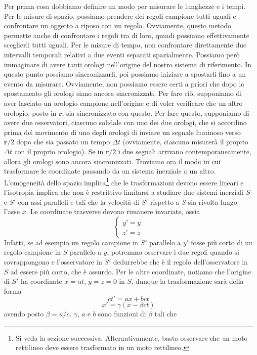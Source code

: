 \documentclass[a4paper,11pt]{book}
\renewcommand{\vec}[1]{\mathbf{#1}}
\theoremstyle{theorem}
\theoremstyle{definition}
\begin{document}
\noindent Per prima cosa dobbiamo definire un modo per misurare le lunghezze e i tempi. Per le misure di spazio, possiamo prendere dei regoli campione tutti uguali e confrontare un oggetto a riposo con un regolo. Ovviamente, questo metodo permette anche di confrontare i regoli tra di loro, quindi possiamo effettivamente sceglierli tutti uguali. Per le misure di tempo, non confrontare direttamente due intervalli temporali relativi a due eventi separati spazialmente. Possiamo però immaginare di avere tanti orologi nell'origine del nostro sistema di riferimento. In questo punto possiamo sincronizzarli, poi possiamo iniziare a spostarli fino a un evento da misurare. Ovviamente, non possiamo essere certi a priori che dopo lo spostamento gli orologi siano ancora sincronizzati. Per fare ciò, supponiamo di aver lasciato un orologio campione nell'origine e di voler verificare che un altro orologio, posto in $\vec{r}$, sia sincronizzato con questo. Per fare questo, supponiamo di avere due osservatori, ciascuno solidale con uno dei due orologi, che si accordino prima del movimento di uno degli orologi di inviare un segnale luminoso verso $\vec{r}/2$ dopo che sia passato un tempo $\Delta t$ (ovviamente, ciascuno misurerà il proprio $\Delta t$ con il proprio orologio). Se in $\vec{r}/2$ i due segnali arrivano contemporaneamente, allora gli orologi sono ancora sincronizzati.
Troviamo ora il modo in cui trasformare le coordinate passando da un sistema inerziale a un altro. L'omogeneità dello spazio implica\footnote{Si veda la sezione successiva. Alternativamente, basta osservare che un moto rettilineo deve essere trasformato in un moto rettilineo.} che le trasformazioni devono essere lineari e l'isotropia implica che non è restrittivo limitarsi a studiare due sistemi inerziali $S$ e $S'$ con assi paralleli e tali che la velocità di $S'$ rispetto a $S$ sia rivolta lungo l'asse $x$. Le coordinate trasverse devono rimanere invariate, ossia
\[\begin{cases}
y'=y\\z'=z
\end{cases}\]
Infatti, se ad esempio un regolo campione in $S'$ parallelo a $y'$ fosse più corto di un regolo campione in $S$ parallelo a $y$, potremmo osservare i due regoli quando si sovrappongono e l'osservatore in $S'$ dedurrebbe che è il regolo dell'osservatore in $S$ ad essere più corto, che è assurdo. Per le altre coordinate, notiamo che l'origine di $S'$ ha coordinate $x=ut$, $y=z=0$ in $S$, dunque la trasformazione sarà della forma
\[ct'=ax+bct\]
\[x'=\gamma(x-\beta ct)\]
avendo posto $\beta=u/c$. $\gamma$, $a$ e $b$ sono funzioni di $\beta$ tali che
\end{document}
